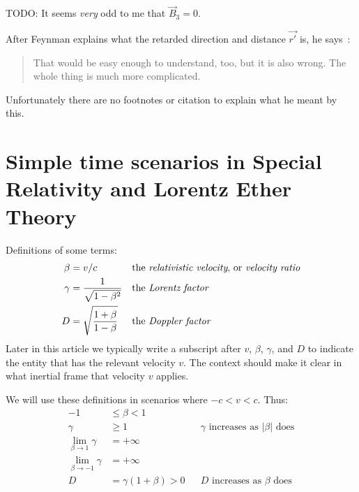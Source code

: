 \documentclass[a4paper]{article}
\theoremstyle{plain}
\theoremstyle{definition}
\newcommand{\vect}[1]{\vec{#1}}
\begin{document}
TODO: It seems {\em very} odd to me that $\vect{B}_3 = 0$.

After Feynman explains what the retarded direction and distance
$\vect{r'}$ is, he says~\cite{FeynmanLecturesVolICh28}:
\begin{quote}
That would be easy enough to understand, too, but it is also
wrong.  The whole thing is much more complicated.
\end{quote}
Unfortunately there are no footnotes or citation to explain what he
meant by this.


\section{Simple time scenarios in Special Relativity and Lorentz Ether Theory}
\label{sec:simple-sr-time}

Definitions of some terms:
\begin{align}
  \beta & = v / c \label{defn:betaB} & & \text{the {\em relativistic velocity}, or {\em velocity ratio}} \\
  \gamma & = \frac{1}{\sqrt{1 - \beta^2}} & & \text{the {\em Lorentz factor}} \label{defn:LorentzFactor} \\
  D & = \sqrt{ \frac{1 + \beta}{1 - \beta} } & & \text{the {\em Doppler factor}} \label{defn:DopplerFactor}
\end{align}
Later in this article we typically write a subscript after $v$,
$\beta$, $\gamma$, and $D$ to indicate the entity that has the
relevant velocity $v$.  The context should make it clear in what
inertial frame that velocity $v$ applies.

We will use these definitions in scenarios where $-c < v < c$.
Thus:
\begin{align}
-1 & \leq \beta < 1 \nonumber \\
\gamma & \geq 1 & & \text{$\gamma$ increases as $|\beta|$ does} \nonumber \\
\lim_{\beta \rightarrow 1} \gamma & = +\infty \nonumber \\
\lim_{\beta \rightarrow -1} \gamma & = +\infty \nonumber \\
D & = \gamma (1+\beta) > 0 & & \text{$D$ increases as $\beta$ does} \label{eqn:DaltFormula}
\end{align}
\end{document}
